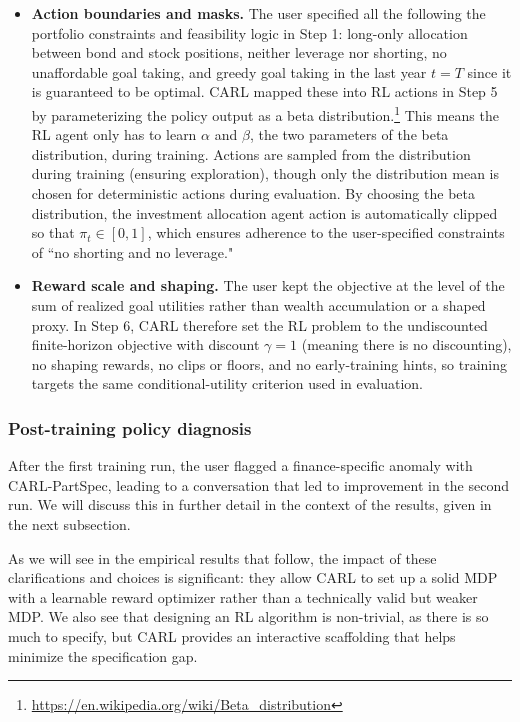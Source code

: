 \documentclass[mnsc,sglanonrev]{informs4}
\begin{document}
\begin{itemize}
\item \textbf{Action boundaries and masks.} The user specified all the following the portfolio constraints and feasibility logic in Step 1: long-only allocation between bond and stock positions, neither leverage nor shorting, no unaffordable goal taking, and greedy goal taking in the last year $t=T$ since it is  guaranteed to be optimal. CARL mapped these into RL actions in Step 5 by parameterizing the policy output as a beta distribution.\footnote{\url{https://en.wikipedia.org/wiki/Beta_distribution}} This means the RL agent only has to learn $\alpha$ and $\beta$, the two parameters of the beta distribution, during training. Actions are sampled from the distribution during training (ensuring exploration), though only the distribution mean is chosen for deterministic actions during evaluation. By choosing the beta distribution, the investment allocation agent action is automatically clipped so that $\pi_t\in[0,1]$, which ensures adherence to the user-specified constraints of ``no shorting and no leverage."

\item \textbf{Reward scale and shaping.} The user kept the objective at the level of the sum of realized goal utilities rather than wealth accumulation or a shaped proxy. In Step 6, CARL therefore set the RL problem to the undiscounted finite-horizon objective with discount $\gamma=1$ (meaning there is no discounting), no shaping rewards, no clips or floors, and no early-training hints, so training targets the same conditional-utility criterion used in evaluation.
\end{itemize}

\subsubsection{Post-training policy diagnosis} 

After the first training run, the user flagged a finance-specific anomaly with CARL-PartSpec, leading to a conversation that led to  improvement in the second run. We will discuss this in further detail in the context of the results, given in the next subsection.


As we will see in the empirical results that follow, the impact of these clarifications and choices is significant: they allow CARL to set up a solid MDP with a learnable reward optimizer rather than a technically valid but weaker MDP. We also see that designing an RL algorithm is non-trivial, as there is so much to specify, but CARL provides an interactive scaffolding that helps minimize the specification gap. 
\end{document}
